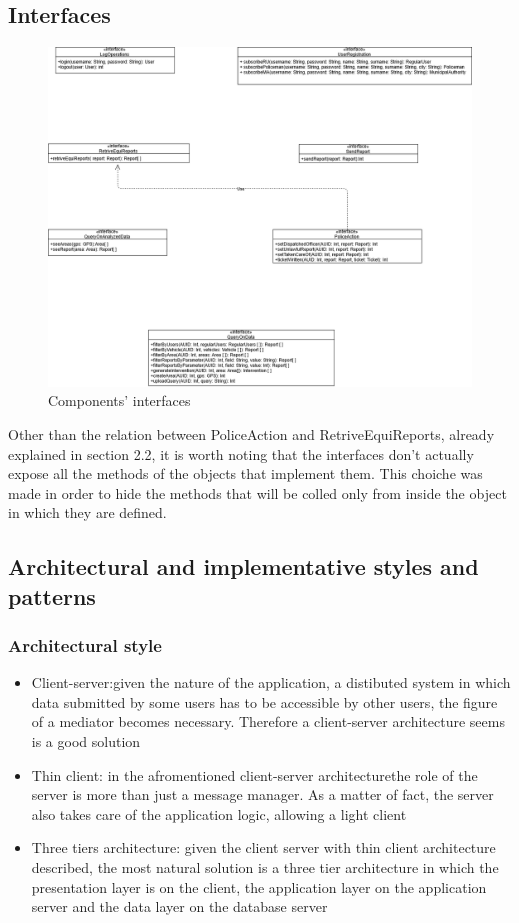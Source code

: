\subsection{Interfaces}
\begin{figure}[h!]
	\centering
	\includegraphics[width=\textwidth]{Images/interface_diagram}
	\caption{Components' interfaces}
\end{figure}
Other than the relation between PoliceAction and RetriveEquiReports, already explained in section 2.2, it is worth noting that the interfaces don't actually expose all the methods of the objects that implement them. This choiche was made in order to hide the methods that will be colled only from inside the object in which they are defined.
\newpage 
\subsection{Architectural and implementative styles and patterns}
\subsubsection{Architectural style}
\begin{itemize}
	\item Client-server:given the nature of the application, a distibuted system in which data submitted by some users has to be accessible by other users, the figure of a mediator becomes necessary. Therefore a client-server architecture seems is a good solution
	\item Thin client: in the afromentioned client-server architecturethe role of the server is more than just a message manager. As a matter of fact, the server also takes care of the application logic, allowing a light client
	\item Three tiers architecture: given the client server with thin client architecture described, the most natural solution is a three tier architecture in which the presentation layer is on the client, the application layer on the application server and the data layer on the database server 
\end{itemize}

